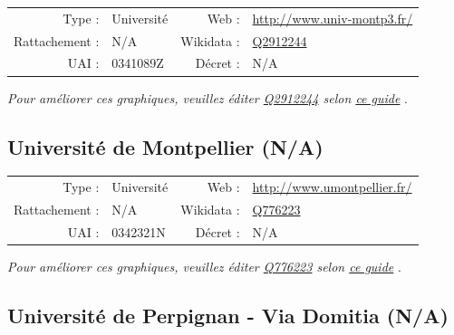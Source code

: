 \documentclass[12pt,french,landscape]{article}
\begin{document}
\begin{tabular*}{0.45\textwidth}{rp{2cm}rl}  
\hline  
Type : & Université & Web : &\href{http://www.univ-montp3.fr/}{http://www.univ-montp3.fr/} \\  
Rattachement : & N/A & Wikidata : & \href{https://www.wikidata.org/entity/Q2912244}{Q2912244} \\  
UAI : & 0341089Z & Décret : & N/A \\  
\hline  
\end{tabular*}

\textit{\scriptsize Pour améliorer ces graphiques, veuillez éditer \href{https://www.wikidata.org/entity/Q2912244}{Q2912244}  selon \href{https://github.com/cpesr/wikidataESR/blob/master/Rmd/wikidataESR.md}{ce guide}}
.


\newpage

\hypertarget{universituxe9-de-montpellier-na}{%
\subsection{Université de Montpellier
(N/A)}\label{universituxe9-de-montpellier-na}}

\begin{tabular*}{0.45\textwidth}{rp{2cm}rl}  
\hline  
Type : & Université & Web : &\href{http://www.umontpellier.fr/}{http://www.umontpellier.fr/} \\  
Rattachement : & N/A & Wikidata : & \href{https://www.wikidata.org/entity/Q776223}{Q776223} \\  
UAI : & 0342321N & Décret : & N/A \\  
\hline  
\end{tabular*}

\textit{\scriptsize Pour améliorer ces graphiques, veuillez éditer \href{https://www.wikidata.org/entity/Q776223}{Q776223}  selon \href{https://github.com/cpesr/wikidataESR/blob/master/Rmd/wikidataESR.md}{ce guide}}
.


\newpage

\hypertarget{universituxe9-de-perpignan---via-domitia-na}{%
\subsection{Université de Perpignan - Via Domitia
(N/A)}\label{universituxe9-de-perpignan---via-domitia-na}}
\end{document}
